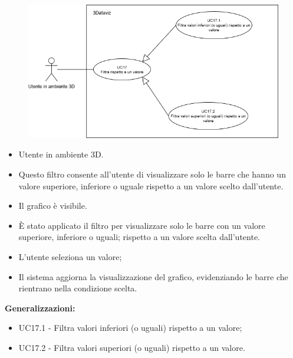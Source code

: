 \begin{figure}[H]\centering
    \includegraphics[scale=0.7]{template/images/UC17.png}
    \caption{}
\end{figure}
\UCdsc
{ %
    \begin{itemize}
        \item Utente in ambiente 3D.
    \end{itemize}
}
{ %
    \begin{itemize}
        \item Questo filtro consente all'utente di visualizzare solo le barre che hanno un valore superiore, inferiore o uguale rispetto a un valore scelto dall’utente. 
    \end{itemize}
}
{ %
    \begin{itemize}
        \item Il grafico è visibile.
    \end{itemize}
}
{ %
    \begin{itemize}
        \item È stato applicato il filtro per visualizzare solo le barre con un valore superiore, inferiore o uguali;
        rispetto a un valore scelta dall’utente.
    \end{itemize}
}
{ %
    \begin{itemize}
        \item L’utente seleziona un valore;
        \item Il sistema aggiorna la visualizzazione del grafico, evidenziando le barre che rientrano nella condizione scelta.
    \end{itemize}
        \item \textbf{Generalizzazioni:} \begin{itemize}
            \item UC17.1 - Filtra valori inferiori (o uguali) rispetto a un valore;
            \item UC17.2 - Filtra valori superiori (o uguali) rispetto a un valore.
        \end{itemize}
    
}



